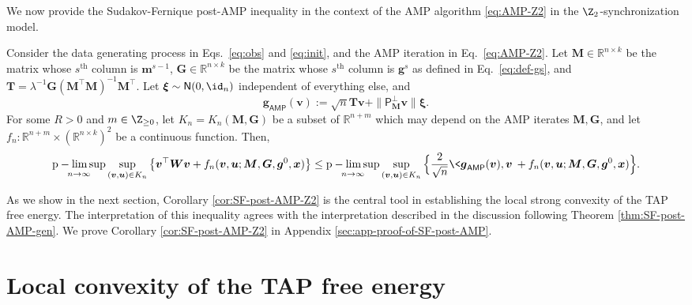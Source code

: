 \documentclass[]{article}
\def\bx{{\boldsymbol x}}
\def\bW{{\boldsymbol W}}
\def\normal{{\sf N}}
\def\bv{{\boldsymbol V}}
\def\bM{{\boldsymbol M}}
\def\bT{\boldsymbol{T}}
\def\proj{{\mathsf P}}
\def\bu{{\boldsymbol u}}
\def\bg{{\boldsymbol g}}
\def\bv{{\boldsymbol v}}
\def\bxi{{\boldsymbol \xi}}
\def\reals{{\mathbb R}}
\def\bx{{\boldsymbol x}}
\def\bW{{\boldsymbol W}}
\def\bG{{\boldsymbol G}}
\def\bv{{\boldsymbol v}}
\def\proj{{\mathsf P}}
\def\normal{{\sf N}}
\def\bu{{\boldsymbol u}}
\def\bg{{\boldsymbol g}}
\def\bbm{{\boldsymbol m}}
\def\AMP{\mathsf{AMP}}
\DeclareMathOperator*{\plimsup}{p-lim\,sup}
\begin{document}
We now provide the Sudakov-Fernique post-AMP inequality in the context of the AMP algorithm \eqref{eq:AMP-Z2} in the $\Z_2$-synchronization model.
\begin{corollary}
\label{cor:SF-post-AMP-Z2}
    Consider the data generating process in Eqs.~\eqref{eq:obs} and \eqref{eq:init},
    and the AMP iteration in Eq.~\eqref{eq:AMP-Z2}.
    Let $\bM \in \reals^{n \times k}$ be the matrix whose $s^\text{th}$ column is $\bbm^{s-1}$,
    $\bG \in \reals^{n \times k}$ be the matrix whose $s^\text{th}$ column is $\bg^s$ as defined in Eq.~\eqref{eq:def-gs},
    and $\bT = \lambda^{-1}\bG (\bM^\top \bM)^{-1} \bM^\top$.
    Let $\bxi \sim \normal(0,\id_n)$ independent of everything else,
    and 
    \begin{equation}
        \bg_{\AMP}(\bv)
            := 
            \sqrt{n} \bT \bv 
            + 
            \| \proj_{\bM}^\perp \bv \| \bxi.
    \end{equation}    
    For some $R > 0$ and $m \in \Z_{\geq 0}$,
    let $K_n = K_n(\bM,\bG)$ be a subset of $\reals^{n + m}$ which may depend on the AMP iterates $\bM,\bG$, 
    and let $f_n: \reals^{n+m} \times (\reals^{n \times k})^2$ be a continuous function.
    Then,
    \begin{equation}
        \plimsup_{n \rightarrow \infty} 
        \sup_{(\bv,\bu) \in K_n} \big\{ \bv^\top \bW \bv + f_n(\bv,\bu;\bM,\bG,\bg^0,\bx) \big\}
        \leq 
        \plimsup_{n \rightarrow \infty} 
        \sup_{(\bv,\bu) \in K_n} \Big\{ \frac{2}{\sqrt{n}}\< \bg_{\AMP}(\bv) , \bv \> + f_n(\bv,\bu;\bM,\bG,\bg^0,\bx) \Big\}.
    \end{equation}
\end{corollary}
\noindent As we show in the next section, Corollary \ref{cor:SF-post-AMP-Z2} is the central tool in establishing the local strong convexity of the TAP free energy.
The interpretation of this inequality agrees with the interpretation described in the discussion following Theorem \ref{thm:SF-post-AMP-gen}.
We prove Corollary \ref{cor:SF-post-AMP-Z2} in Appendix \ref{sec:app-proof-of-SF-post-AMP}.

\section{Local convexity of the TAP free energy}
\label{sec:main}
\end{document}
